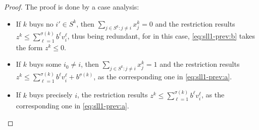 \begin{proof}
    The proof is done by a case analysis:
    \begin{itemize}
            
        \item %
            If $k$ buys no $i' \in S^k$, then
            {
                \newcommand{\sumjneq} {\sum_{j \in S^k : j \neq i}}
                $\sumjneq x_j^k = 0$
            }
            and the restriction results
            $
                z^k \leq \sum_{\ell=1}^{\sigma(k)} b^\ell v_i^\ell
            $,
	    thus being redundant, for in this case, \eqref{eq:sll1-prev:b} takes
	    the form $z^k \leq 0$.
        \item %
            If $k$ buys some $i_0 \neq i$, then
            {
                \newcommand{\sumjneq} {\sum_{j \in S^k : j \neq i}}
                $\sumjneq x_j^k = 1$
            }
            and the restriction results
            $
                z^k \leq
                    \sum_{\ell=1}^{\sigma(k)} b^\ell v_i^\ell
                    + b^{\sigma(k)}
            $,
            as the corresponding one in \eqref{eq:sll1-prev:a}.
        \item %
            If $k$ buys precisely $i$, the restriction results
            $
                z^k \leq \sum_{\ell=1}^{\sigma(k)} b^\ell v_i^\ell
            $,
            as the corresponding one in \eqref{eq:sll1-prev:a}.
    \end{itemize}
\end{proof}

